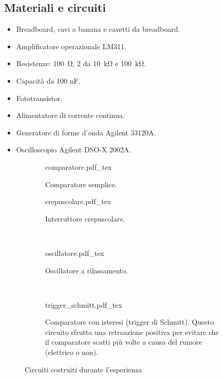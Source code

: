 \subsection{Materiali e circuiti}

\begin{itemize}
    \item{Breadboard, cavi a banana e cavetti da breadboard.}
    \item{Amplificatore operazionale LM311.}
    \item{Resistenze: \SI{100}{\ohm}, 2 da \SI{10}{\kilo\ohm} e \SI{100}{\kilo\ohm}.}
    \item{Capacità da 100 nF.}
    \item{Fototransistor.}
    \item{Alimentatore di corrente continua.}
    \item{Generatore di forme d'onda Agilent 33120A.}
    \item{Oscilloscopio Agilent DSO-X 2002A.}
\end{itemize}

\begin{figure*}[b!]
        \centering
        \begin{subfigure}[b]{0.33\textwidth}
            \def\svgwidth{\columnwidth}
            {comparatore.pdf_tex}
            \caption{Comparatore semplice.}
            \label{fig:comparatore4}
        \end{subfigure}
        \quad
        \begin{subfigure}[b]{0.63\textwidth}
            \def\svgwidth{\columnwidth}
            {crepuscolare.pdf_tex}
            \caption{Interruttore crepuscolare.}
            \label{fig:crepuscolare4}
        \end{subfigure}
        ~
        \begin{subfigure}[b]{0.48\textwidth}
            \def\svgwidth{\columnwidth}
            {oscillatore.pdf_tex}
            \caption{Oscillatore a rilassamento.}
            \label{fig:oscillatore4}
        \end{subfigure}
        ~
        \begin{subfigure}[b]{0.44\textwidth}
            \def\svgwidth{\columnwidth}
            {trigger_schmitt.pdf_tex}
            \caption{Comparatore con isteresi (trigger di Schmitt). Questo circuito
                sfrutta una retroazione positiva per evitare che il comparatore
                scatti più volte a causa del rumore (elettrico o non).}
            \label{fig:trigger_schmitt4}
        \end{subfigure}

        \caption{Circuiti costruiti durante l'esperienza}
        \label{fig:circuits4}
\end{figure*}

